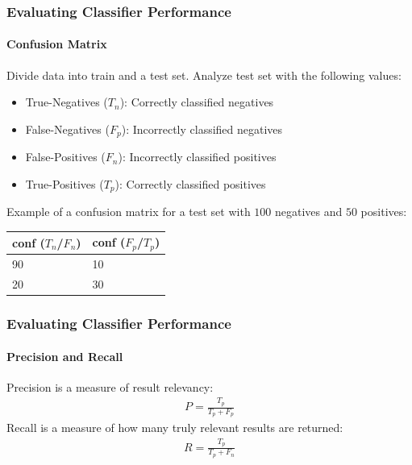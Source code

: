 \documentclass{beamer}
\begin{document}
\begin{frame}
    \frametitle{Evaluating Classifier Performance}
    \framesubtitle{Confusion Matrix}
\par Divide data into train and a test set. Analyze test set with the following values:
      \begin{itemize}
      \item True-Negatives ($T_n$): Correctly classified negatives
      \item False-Negatives ($F_p$): Incorrectly classified negatives
      \item False-Positives ($F_n$): Incorrectly classified positives
      \item True-Positives ($T_p$): Correctly classified positives
    \end{itemize}
    \par Example of a confusion matrix for a test set with $100$ negatives and $50$ positives:
    \begin{table}[H]
    \centering
    \label{tab:confEx}
    \begin{tabular}{|l||l|}\hline
    conf ($T_n$/$F_n$) & conf ($F_p$/$T_p$) \\ \hline
    90 & 10 \\ \hline
    20 & 30 \\ \hline
    \end{tabular}
    \end{table}
\end{frame}
\begin{frame}
    \frametitle{Evaluating Classifier Performance}
    \framesubtitle{Precision and Recall}
    Precision is a measure of result relevancy:
    \begin{equation}
    \label{eq:precision}
    \begin{aligned}
    P = \frac{T_p}{T_p+F_p}
    \end{aligned}
    \end{equation}
    Recall is a measure of how many truly relevant results are returned:
    \begin{equation}
    \label{eq:recall}
    \begin{aligned}
    R = \frac{T_p}{T_p+F_n}
    \end{aligned}
    \end{equation}
\end{frame}
\end{document}
